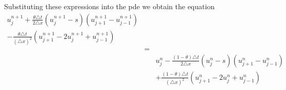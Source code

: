 Substituting these expressions into the pde we obtain the equation 
\begin{eqnarray*}
u_j^{n+1} + \frac{\theta \triangle t }{2 \triangle x}(u_j^{n+1}-s)(u_{j+1}^{n+1} - u_{j-1}^{n+1}) && \\
- \frac{\theta \triangle t}{(\triangle x)^2}(u_{j+1}^{n+1} - 2u_j^{n+1}+ u_{j-1}^{n+1})&&\\
 &=& \\
&& u_j^n - \frac{(1-\theta)\triangle t}{2 \triangle x}(u_j^n-s) (u_{j+1}^n - u_{j-1}^n) \\
&&+ \frac{(1-\theta) \triangle t}{(\triangle x)^2} (u_{j+1}^n -2u_j^n + u_{j-1}^n)
\end{eqnarray*}









